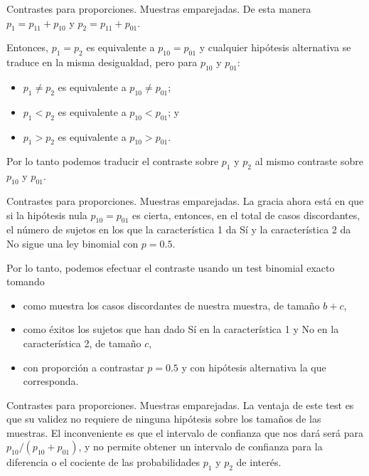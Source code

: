 \documentclass[
  ignorenonframetext,
]{beamer}
\begin{document}
\begin{frame}{Contrastes para proporciones. Muestras emparejadas.}
\protect\hypertarget{contrastes-para-proporciones.-muestras-emparejadas.-1}{}
De esta manera \(p_1=p_{11}+p_{10}\) y \(p_2=p_{11}+p_{01}\).

Entonces, \(p_1=p_2\) es equivalente a \(p_{10}=p_{01}\) y cualquier
hipótesis alternativa se traduce en la misma desigualdad, pero para
\(p_{10}\) y \(p_{01}\):

\begin{itemize}[<+->]
\item
  \(p_1\neq p_2\) es equivalente a \(p_{10}\neq p_{01}\);
\item
  \(p_1< p_2\) es equivalente a \(p_{10}< p_{01}\); y
\item
  \(p_1> p_2\) es equivalente a \(p_{10}> p_{01}\).
\end{itemize}

Por lo tanto podemos traducir el contraste sobre \(p_1\) y \(p_2\) al
mismo contraste sobre \(p_{10}\) y \(p_{01}\).
\end{frame}

\begin{frame}{Contrastes para proporciones. Muestras emparejadas.}
\protect\hypertarget{contrastes-para-proporciones.-muestras-emparejadas.-2}{}
La gracia ahora está en que si la hipótesis nula \(p_{10}=p_{01}\) es
cierta, entonces, en el total de casos discordantes, el número de
sujetos en los que la característica 1 da Sí y la característica 2 da No
sigue una ley binomial con \(p=0.5\).

Por lo tanto, podemos efectuar el contraste usando un test binomial
exacto tomando

\begin{itemize}[<+->]
\item
  como muestra los casos discordantes de nuestra muestra, de tamaño
  \(b+c\),
\item
  como éxitos los sujetos que han dado Sí en la característica 1 y No en
  la característica 2, de tamaño \(c\),
\item
  con proporción a contrastar \(p=0.5\) y con hipótesis alternativa la
  que corresponda.
\end{itemize}
\end{frame}

\begin{frame}{Contrastes para proporciones. Muestras emparejadas.}
\protect\hypertarget{contrastes-para-proporciones.-muestras-emparejadas.-3}{}
La ventaja de este test es que su validez no requiere de ninguna
hipótesis sobre los tamaños de las muestras. El inconveniente es que el
intervalo de confianza que nos dará será para
\(p_{10}/(p_{10}+p_{01})\), y no permite obtener un intervalo de
confianza para la diferencia o el cociente de las probabilidades \(p_1\)
y \(p_2\) de interés.
\end{frame}
\end{document}
